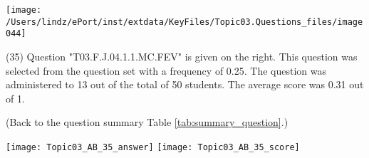 \documentclass[12pt,english,nohyper]{tufte-handout}\usepackage[]{graphicx}\usepackage[]{color}
\begin{document}
\vspace{6cm}\begin{marginfigure}\texttt{[image: /Users/lindz/ePort/inst/extdata/KeyFiles/Topic03.Questions\_files/image044]}\end{marginfigure}\vspace{-6cm} (35) Question "T03.F.J.04.1.1.MC.FEV" is given on the right. This question was selected from the question set with a frequency of 0.25. The question was administered to 13 out of the total of 50 students. The average score was 0.31 out of 1.

 (Back to the question summary Table \ref{tab:summary_question}.)

\begin{center} \texttt{[image: Topic03\_AB\_35\_answer]} \texttt{[image: Topic03\_AB\_35\_score]} \end{center} 
\end{document}
